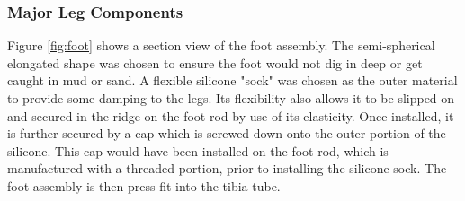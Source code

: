 \subsubsection{Major Leg Components}

Figure \ref{fig:foot} shows a section view of the foot assembly. The semi-spherical elongated shape was chosen to ensure the foot would not dig in deep or get caught in mud or sand. A flexible silicone "sock" was chosen as the outer material to provide some damping to the legs. Its flexibility also allows it to be slipped on and secured in the ridge on the foot rod by use of its elasticity. Once installed, it is further secured by a cap which is screwed down onto the outer portion of the silicone. This cap would have been installed on the foot rod, which is manufactured with a threaded portion, prior to installing the silicone sock. The foot assembly is then press fit into the tibia tube. 

